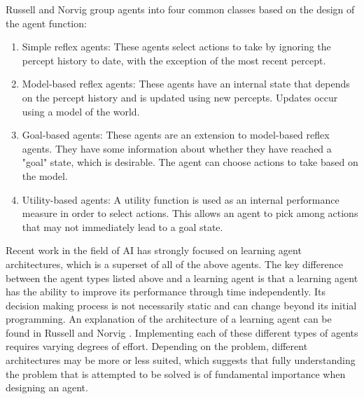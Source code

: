 Russell and Norvig group agents into four common classes based on the design of the agent function\cite[p.~47]{AIAMA}: 
\begin{enumerate}
    \item Simple reflex agents: These agents select actions to take by ignoring the percept history to date, with the exception of the most recent percept.
    \item Model-based reflex agents: These agents have an internal state that depends on the percept history and is updated using new percepts. Updates occur using a model of the world.
    \item Goal-based agents: These agents are an extension to model-based reflex agents. They have some information about whether they have reached a "goal" state, which is desirable. The agent can choose actions to take based on the model. %
    \item Utility-based agents: A utility function is used as an internal performance measure in order to select actions. This allows an agent to pick among actions that may not immediately lead to a goal state.
\end{enumerate}
Recent work in the field of AI has strongly focused on learning agent architectures, which is a superset of all of the above agents. The key difference between the agent types listed above and a learning agent is that a learning agent has the ability to improve its performance through time independently. Its decision making process is not necessarily static and can change beyond its initial programming. An explanation of the architecture of a learning agent can be found in Russell and Norvig \cite[p.~55]{AIAMA}. Implementing each of these different types of agents requires varying degrees of effort. Depending on the problem, different architectures may be more or less suited, which suggests that fully understanding the problem that is attempted to be solved is of fundamental importance when designing an agent.

